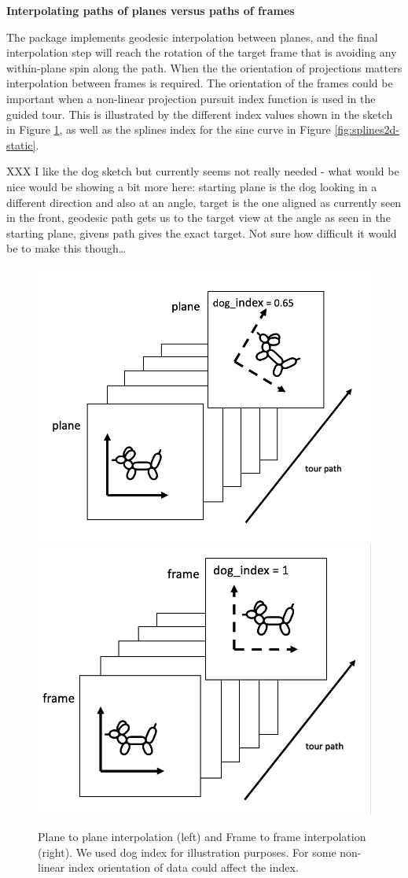 \textbf{Interpolating paths of planes versus paths of frames}

The  package implements geodesic interpolation between
planes, and the final interpolation step will reach the rotation of the
target frame that is avoiding any within-plane spin along the path. When
the the orientation of projections matters interpolation between frames
is required. The orientation of the frames could be important when a
non-linear projection pursuit index function is used in the guided tour.
This is illustrated by the different index values shown in the sketch in
Figure \ref{fig:dogs}, as well as the splines index for the sine curve
in Figure \ref{fig:splines2d-static}.

XXX I like the dog sketch but currently seems not really needed - what
would be nice would be showing a bit more here: starting plane is the
dog looking in a different direction and also at an angle, target is the
one aligned as currently seen in the front, geodesic path gets us to the
target view at the angle as seen in the starting plane, givens path
gives the exact target. Not sure how difficult it would be to make this
though\ldots{}

\begin{Schunk}
\begin{figure}

{\centering \includegraphics[width=0.45\linewidth]{figures/plane} \includegraphics[width=0.45\linewidth]{figures/frame} 

}

\caption[Plane to plane interpolation (left) and Frame to frame interpolation (right)]{Plane to plane interpolation (left) and Frame to frame interpolation (right). We used dog index for illustration purposes. For some non-linear index orientation of data could affect the index.}\label{fig:dogs}
\end{figure}
\end{Schunk}


